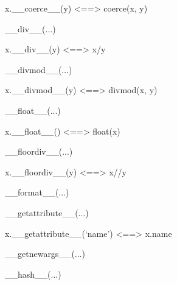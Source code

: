 \documentclass[letterpaper,10pt,english]{sphinxmanual}
\begin{document}
\begin{description}
\begin{description}
\begin{DUlineblock}{0em}
\begin{DUlineblock}{\DUlineblockindent}
\item[] x.\_\_coerce\_\_(y) \textless{}==\textgreater{} coerce(x, y)
\item[] 
\end{DUlineblock}
\item[] \_\_div\_\_(...)
\item[]
\begin{DUlineblock}{\DUlineblockindent}
\item[] x.\_\_div\_\_(y) \textless{}==\textgreater{} x/y
\item[] 
\end{DUlineblock}
\item[] \_\_divmod\_\_(...)
\item[]
\begin{DUlineblock}{\DUlineblockindent}
\item[] x.\_\_divmod\_\_(y) \textless{}==\textgreater{} divmod(x, y)
\item[] 
\end{DUlineblock}
\item[] \_\_float\_\_(...)
\item[]
\begin{DUlineblock}{\DUlineblockindent}
\item[] x.\_\_float\_\_() \textless{}==\textgreater{} float(x)
\item[] 
\end{DUlineblock}
\item[] \_\_floordiv\_\_(...)
\item[]
\begin{DUlineblock}{\DUlineblockindent}
\item[] x.\_\_floordiv\_\_(y) \textless{}==\textgreater{} x//y
\item[] 
\end{DUlineblock}
\item[] \_\_format\_\_(...)
\item[] 
\item[] \_\_getattribute\_\_(...)
\item[]
\begin{DUlineblock}{\DUlineblockindent}
\item[] x.\_\_getattribute\_\_(`name') \textless{}==\textgreater{} x.name
\item[] 
\end{DUlineblock}
\item[] \_\_getnewargs\_\_(...)
\item[] 
\item[] \_\_hash\_\_(...)

\end{DUlineblock}
\end{description}
\end{description}
\end{document}
